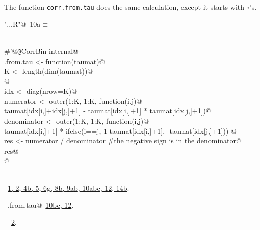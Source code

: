 \documentclass[reqno]{amsart}
\renewcommand{\NWtarget}[2]{\hypertarget{#1}{#2}}
\renewcommand{\NWlink}[2]{\hyperlink{#1}{#2}}
\begin{document}
The function \texttt{corr.from.tau} does the same calculation, except it starts with $\tau$'s. 
\begin{flushleft} \small\label{scrap41}\raggedright\small
\NWtarget{nuweb10a}{} \verb@"..\R\ExchMultinomial.R"@\nobreak\ {\footnotesize {10a}}$\equiv$
\vspace{-1ex}
\begin{list}{}{} \item
\mbox{}\verb@@\\
\mbox{}\verb@#'@{\tt @}\verb@rdname CorrBin-internal@\\
\mbox{}\verb@corr.from.tau <- function(taumat){@\\
\mbox{}\verb@  K <- length(dim(taumat))@\\
\mbox{}\verb@  @\\
\mbox{}\verb@  idx <- diag(nrow=K)@\\
\mbox{}\verb@  numerator <- outer(1:K, 1:K, function(i,j){@\\
\mbox{}\verb@     taumat[idx[i,]+idx[j,]+1] - taumat[idx[i,]+1] * taumat[idx[j,]+1]})@\\
\mbox{}\verb@  denominator <- outer(1:K, 1:K, function(i,j){@\\
\mbox{}\verb@     taumat[idx[i,]+1] * ifelse(i==j, 1-taumat[idx[i,]+1], -taumat[idx[j,]+1])})  @\\
\mbox{}\verb@  res <- numerator / denominator    #the negative sign is in the denominator@\\
\mbox{}\verb@  res@\\
\mbox{}\verb@}@\\
\mbox{}\verb@@\\
\mbox{}\verb@@{\NWsep}
\end{list}
\vspace{-1.5ex}
\footnotesize
\begin{list}{}{\setlength{\itemsep}{-\parsep}\setlength{\itemindent}{-\leftmargin}}
\item \NWtxtFileDefBy\ \NWlink{nuweb1}{1}\NWlink{nuweb2}{, 2}\NWlink{nuweb4b}{, 4b}\NWlink{nuweb5}{, 5}\NWlink{nuweb6g}{, 6g}\NWlink{nuweb8b}{, 8b}\NWlink{nuweb9a}{, 9a}\NWlink{nuweb9b}{b}\NWlink{nuweb10a}{, 10a}\NWlink{nuweb10b}{b}\NWlink{nuweb10c}{c}\NWlink{nuweb12}{, 12}\NWlink{nuweb14b}{, 14b}.
\item \NWtxtIdentsDefed\nobreak\  \verb@corr.from.tau@\nobreak\ \NWlink{nuweb10b}{10b}\NWlink{nuweb10c}{c}\NWlink{nuweb12}{, 12}.\item \NWtxtIdentsUsed\nobreak\  \verb@tau@\nobreak\ \NWlink{nuweb2}{2}.
\item{}
\end{list}
\vspace{4ex}
\end{flushleft}
\end{document}
